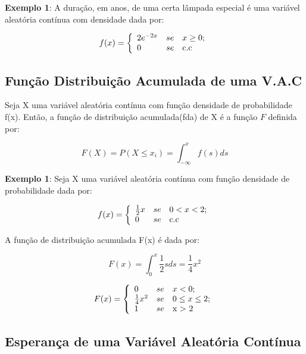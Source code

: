 \newpage
\textbf{Exemplo 1}: A duração, em anos, de uma certa lâmpada
especial é uma variável aleatória contínua com densidade dada por:


$$
f(x)=
\left\{%
\begin{array}{ll}
   2e^{-2x}       & se \quad \hbox{$x \geq 0$;} \\
   0              & se \quad \hbox{c.c} \\
\end{array}%
\right.
$$



\subsection{Função Distribuição Acumulada de uma V.A.C}

Seja X uma variável aleatória contínua com função densidade de
probabilidade f(x). Então, a função de distribuição acumulada(fda)
de X é a função $F$ definida por:


\begin{equation}\label{F}
    F(X) = P(X\leq x_{i})= \int_{-\infty}^{x}f(s)ds
\end{equation}


\textbf{Exemplo 1}: Seja X uma variável aleatória contínua com
função densidade de probabilidade dada por:

$$
f(x)=
\left\{%
\begin{array}{ll}
   \frac{1}{2}x   & se \quad \hbox{$0 < x < 2$;} \\
   0              & se \quad \hbox{c.c} \\
\end{array}%
\right.
$$

A função de distribuição acumulada F(x) é dada por:

$$
F(x) = \int^{x}_{0}\frac{1}{2}sds = \frac{1}{4}x^{2}
$$

$$
F(x)=
\left\{%
\begin{array}{ll}
    0                 & se \quad \hbox{$x < 0$;} \\
   \frac{1}{4}x^{2}   & se \quad \hbox{$0 \leq x \leq 2$;} \\
   1                  & se \quad \hbox{x > 2} \\
\end{array}%
\right.
$$


\subsection{Esperança de uma Variável Aleatória Contínua}


